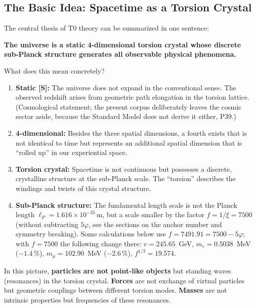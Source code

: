 	\subsection{The Basic Idea: Spacetime as a Torsion Crystal}
	
	The central thesis of T0 theory can be summarized in one sentence:
	
	\begin{center}
		\textbf{The universe is a static 4-dimensional torsion crystal whose discrete sub-Planck structure generates all observable physical phenomena.}
	\end{center}
	
	What does this mean concretely?
	
	\begin{enumerate}
		\item \textbf{Static \textbf{[S]}:} The universe does not expand in the conventional sense. The observed redshift arises from geometric path elongation in the torsion lattice. (Cosmological statement; the present corpus deliberately leaves the cosmic sector aside, because the Standard Model does not derive it either, P39.)
		\item \textbf{4-dimensional:} Besides the three spatial dimensions, a fourth exists that is not identical to time but represents an additional spatial dimension that is \enquote{rolled up} in our experiential space.
		\item \textbf{Torsion crystal:} Spacetime is not continuous but possesses a discrete, crystalline structure at the sub-Planck scale. The \enquote{torsion} describes the windings and twists of this crystal structure.
		\item \textbf{Sub-Planck structure:} The fundamental length scale is not the Planck length \(\ell_P = 1.616 \times 10^{-35}\,\text{m}\), but a scale smaller by the factor \(f = 1/\xi = 7500\) (without subtracting $5\varphi$, see the sections on the anchor number and symmetry breaking). Some calculations below use $f = 7491.91 = 7500 - 5\varphi$; with $f = 7500$ the following change there: $v = 245.65$~GeV, $m_e = 0.5038$~MeV ($-1.4\,\%$), $m_\mu = 102.90$~MeV ($-2.6\,\%$), $f^{1/3} = 19.574$.
	\end{enumerate}
	
	In this picture, \textbf{particles are not point-like objects} but standing waves (resonances) in the torsion crystal. \textbf{Forces} are not exchange of virtual particles but geometric couplings between different torsion modes. \textbf{Masses} are not intrinsic properties but frequencies of these resonances.
	
